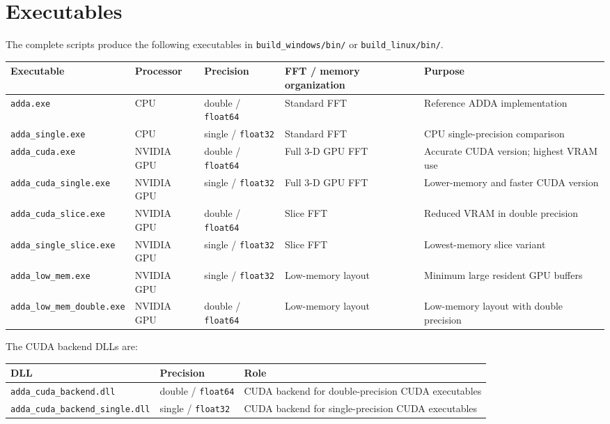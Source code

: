 \documentclass[11pt,a4paper]{article}
\newcommand{\code}[1]{\nolinkurl{#1}}
\begin{document}
\section{Executables}

The complete scripts produce the following executables in
\code{build_windows/bin/} or \code{build_linux/bin/}.

\small
\begin{longtable}{@{}L{0.18\textwidth}L{0.11\textwidth}L{0.14\textwidth}L{0.22\textwidth}L{0.247\textwidth}@{}}
\toprule
\textbf{Executable} & \textbf{Processor} & \textbf{Precision} &
\textbf{FFT / memory organization} & \textbf{Purpose} \\
\midrule
\endhead
\code{adda.exe} & CPU & double / \code{float64} & Standard FFT & Reference ADDA implementation \\
\code{adda_single.exe} & CPU & single / \code{float32} & Standard FFT & CPU single-precision comparison \\
\code{adda_cuda.exe} & NVIDIA GPU & double / \code{float64} & Full 3-D GPU FFT & Accurate CUDA version; highest VRAM use \\
\code{adda_cuda_single.exe} & NVIDIA GPU & single / \code{float32} & Full 3-D GPU FFT & Lower-memory and faster CUDA version \\
\code{adda_cuda_slice.exe} & NVIDIA GPU & double / \code{float64} & Slice FFT & Reduced VRAM in double precision \\
\code{adda_single_slice.exe} & NVIDIA GPU & single / \code{float32} & Slice FFT & Lowest-memory slice variant \\
\code{adda_low_mem.exe} & NVIDIA GPU & single / \code{float32} & Low-memory layout & Minimum large resident GPU buffers \\
\code{adda_low_mem_double.exe} & NVIDIA GPU & double / \code{float64} & Low-memory layout & Low-memory layout with double precision \\
\bottomrule
\end{longtable}
\normalsize

The CUDA backend DLLs are:

\begin{longtable}{@{}L{0.31\textwidth}L{0.17\textwidth}L{0.44\textwidth}@{}}
\toprule
\textbf{DLL} & \textbf{Precision} & \textbf{Role} \\
\midrule
\endhead
\code{adda_cuda_backend.dll} & double / \code{float64} & CUDA backend for double-precision CUDA executables \\
\code{adda_cuda_backend_single.dll} & single / \code{float32} & CUDA backend for single-precision CUDA executables \\
\bottomrule
\end{longtable}
\end{document}
